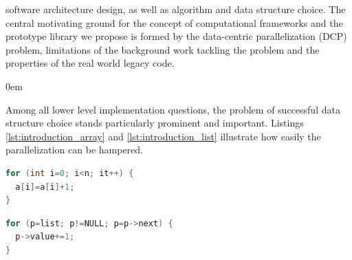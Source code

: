 software architecture design, as well as algorithm and data structure choice. The central motivating ground for the concept of computational frameworks and the prototype library we propose is formed by the data-centric parallelization (DCP) problem, limitations of the background work tackling the problem and the properties of the real world legacy code.
\begin{description}[style=unboxed,leftmargin=0cm]
\itemsep0em
\item[Data-centric parallelization problem] Among all lower level implementation questions, the problem of successful data structure choice stands particularly prominent and important. Listings \ref{lst:introduction_array} and \ref{lst:introduction_list} illustrate how easily the parallelization can be hampered.\newline\null
\begin{minipage}[t]{0.45\linewidth}
\begin{lstlisting}[caption={Parallelisable loop operating on a \textbf{linear array}.},label={lst:introduction_array},language=C]
for (int i=0; i<n; it++) {
  a[i]=a[i]+1;
}
\end{lstlisting}
\end{minipage}
%
\begin{minipage}[t]{0.5\linewidth}
\begin{lstlisting}[caption={Non-parallelisable loop operating on a \textbf{linked-list}.},label={lst:introduction_list},language=C]
for (p=list; p!=NULL; p=p->next) {
  p->value+=1;
}
\end{lstlisting}
\end{minipage}


\end{description}
